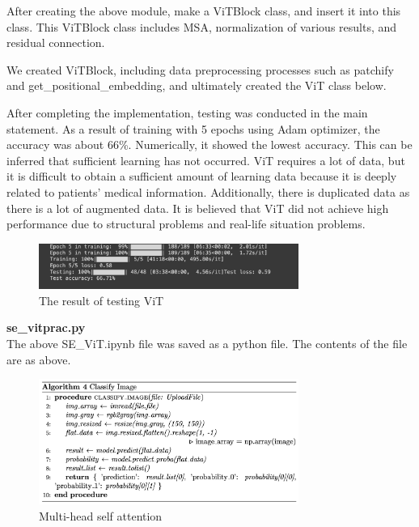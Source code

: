 After creating the above module, make a ViTBlock class, and insert it into this class. This ViTBlock class includes MSA, normalization of various results, and residual connection.


We created ViTBlock, including data preprocessing processes such as patchify and get\_positional\_embedding, and ultimately created the ViT class below.

After completing the implementation, testing was conducted in the main statement. As a result of training with 5 epochs using Adam optimizer, the accuracy was about 66\%. Numerically, it showed the lowest accuracy. This can be inferred that sufficient learning has not occurred. ViT requires a lot of data, but it is difficult to obtain a sufficient amount of learning data because it is deeply related to patients' medical information. Additionally, there is duplicated data as there is a lot of augmented data. It is believed that ViT did not achieve high performance due to structural problems and real-life situation problems.

\begin{figure}[H]
    \centering
    \includegraphics[width=8.5cm]{images/ViT_result.png}
    \caption{The result of testing ViT}
    \label{fig:enter-label}
\end{figure}

\textbf{se\_vitprac.py} \\
The above SE\_ViT.ipynb file was saved as a python file. The contents of the file are as above.

\begin{figure}[H]
    \centering
    \includegraphics[width=8.5cm]{images/app.py_algorithm.png}
    \caption{Multi-head self attention}
    \label{fig:enter-label}
\end{figure}

